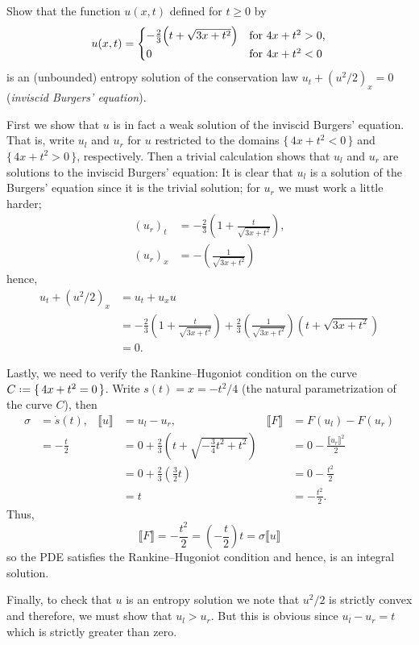 \begin{problem}
  Show that the function \(u(x,t)\) defined for \(t\geq 0\) by
  \[
    u(x,t)=
    \begin{cases}
      -\tfrac{2}{3}\Bigl(t+\sqrt{3x+t^2}\Bigr)
      &\text{for \(4x+t^2>0\),}\\
      0
      &\text{for \(4x+t^2<0\)}
    \end{cases}
  \]
  is an (unbounded) entropy solution of the conservation law
  \(u_t+(u^2/2)_x=0\) (\emph{inviscid Burgers' equation}).
\end{problem}
\begin{solution*}
  First we show that \(u\) is in fact a weak solution of the inviscid
  Burgers' equation. That is, write \(u_l\) and \(u_r\) for \(u\)
  restricted to the domains \(\{\,4x+t^2<0\,\}\) and \(\{\,4x+t^2>0\,\}\),
  respectively. Then a trivial calculation shows that \(u_l\) and \(u_r\)
  are solutions to the inviscid Burgers' equation: It is clear that \(u_l\)
  is a solution of the Burgers' equation since it is the trivial solution;
  for \(u_r\) we must work a little harder;
  \begin{align*}
    {(u_r)}_t&=-\frac{2}{3}\left(1+\frac{t}{\sqrt{3x+t^2}}\right),\\
    {(u_r)}_x&=-\left(\frac{1}{\sqrt{3x+t^2}}\right)
  \end{align*}
  hence,
  \begin{align*}
    u_t+(u^2/2)_x
    &=u_t+u_xu\\
    &=-\frac{2}{3}\left(1+\frac{t}{\sqrt{3x+t^2}}\right)
      +\frac{2}{3}
      \left(\frac{1}{\sqrt{3x+t^2}}\right)\left(t+\sqrt{3x+t^2}\right)\\
    &=0.
  \end{align*}

  Lastly, we need to verify the Rankine--Hugoniot condition on the curve
  \(C\defeq \{\,4x+t^2=0\,\}\). Write \(s(t)=x=-t^2/4\) (the natural
  parametrization of the curve \(C\)), then
  \begin{align*}
    \sigma&=\dot s(t),
    &\llbracket u\rrbracket
    &=u_l-u_r,
    &\llbracket F\rrbracket
    &=F(u_l)-F(u_r)\\
          &=-\frac{t}{2}
    &&=0+\frac{2}{3}\left(t+\sqrt{-\tfrac{3}{4}t^2+t^2}\right)
    &&=0-\frac{\llbracket u_r\rrbracket^2}{2}\\
          &&
    &=0+\frac{2}{3}\left(\frac{3}{2}t\right)
    &&=0-\frac{t^2}{2}
    \\
          &&&=t&&=-\frac{t^2}{2}.
  \end{align*}
  Thus,
  \[
    \llbracket
    F\rrbracket=-\frac{t^2}{2}=\left(-\frac{t}{2}\right)t=\sigma\llbracket
    u\rrbracket
  \]
  so the PDE satisfies the Rankine--Hugoniot condition and hence, is an
  integral solution.

  Finally, to check that \(u\) is an entropy solution we note that
  \(u^2/2\) is strictly convex and therefore, we must show that
  \(u_l>u_r\). But this is obvious since \(u_l-u_r=t\) which is strictly
  greater than zero.
\end{solution*}

